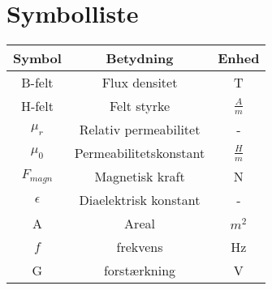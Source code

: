 \section{Symbolliste}

\begin{tabular}{|c|c|c|}
\hline 
Symbol & Betydning & Enhed \\ 
\hline 
B-felt & Flux densitet & T \\ 
\hline 
H-felt & Felt styrke & $\frac{A}{m}$\\
\hline 
$\mu_{r}$ & Relativ permeabilitet & - \\
\hline 
$\mu_{0}$ & Permeabilitetskonstant & $\frac{H}{m}$\\
\hline 
$F_{magn}$ & Magnetisk kraft & N \\
\hline
$\epsilon$ & Diaelektrisk konstant & - \\
\hline
A & Areal	& $m^{2}$ \\
\hline
$f$ & frekvens & Hz \\
\hline
G & forstærkning &	V \\
\hline
\end{tabular} 
